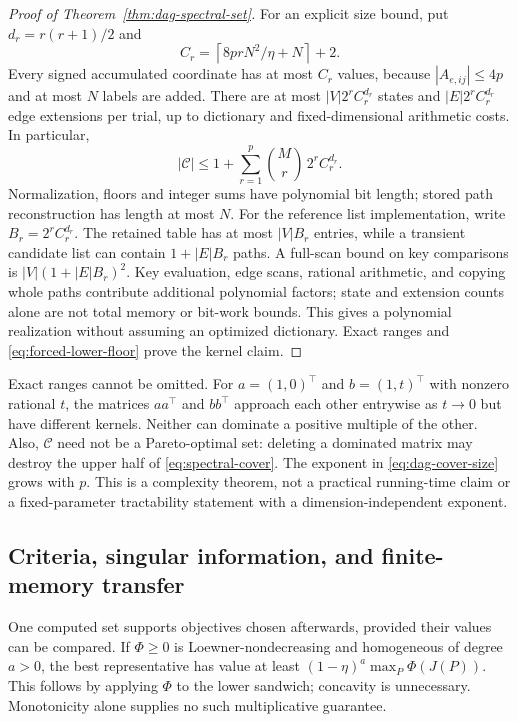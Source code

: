 \begin{proof}[Proof of Theorem~\ref{thm:dag-spectral-set}]
For an explicit size bound, put
$d_r=r(r+1)/2$ and
\[
 C_r=\left\lceil8prN^2/\eta+N\right\rceil+2.
\]
Every signed accumulated coordinate has at most $C_r$ values, because
$|A_{e,ij}|\le4p$ and at most $N$ labels are added. There are at most
$|V|2^rC_r^{d_r}$ states and $|E|2^rC_r^{d_r}$ edge extensions per trial,
up to dictionary and fixed-dimensional arithmetic costs. In particular,
\begin{equation}
 |\mathcal C|\le1+\sum_{r=1}^p\binom Mr\,2^rC_r^{d_r}.
 \label{eq:dag-cover-size}
\end{equation}
Normalization, floors and integer sums have polynomial bit length; stored
path reconstruction has length at most $N$. For the reference list
implementation, write $B_r=2^r C_r^{d_r}$. The retained table has at most
$|V|B_r$ entries, while a transient candidate list can contain
$1+|E|B_r$ paths. A full-scan bound on key comparisons is
$|V|(1+|E|B_r)^2$. Key evaluation, edge scans, rational arithmetic, and
copying whole paths contribute additional polynomial factors; state and
extension counts alone are not total memory or bit-work bounds. This gives
a polynomial realization without assuming an optimized dictionary.
Exact ranges and \eqref{eq:forced-lower-floor} prove the kernel claim.
\end{proof}

Exact ranges cannot be omitted. For $a=(1,0)^\top$ and
$b=(1,t)^\top$ with nonzero rational $t$, the matrices $aa^\top$ and
$bb^\top$ approach each other entrywise as $t\to0$ but have different
kernels. Neither can dominate a positive multiple of the other. Also,
$\mathcal C$ need not be a Pareto-optimal set: deleting a dominated matrix
may destroy the upper half of \eqref{eq:spectral-cover}.
The exponent in \eqref{eq:dag-cover-size} grows with $p$. This is a
complexity theorem, not a practical running-time claim or a fixed-parameter
tractability statement with a dimension-independent exponent.

\subsection{Criteria, singular information, and finite-memory transfer}
\label{subsec:spectral-consequences}
One computed set supports objectives chosen afterwards, provided their
values can be compared. If $\Phi\ge0$ is Loewner-nondecreasing and
homogeneous of degree $a>0$, the best representative has value at least
$(1-\eta)^a\max_P\Phi(J(P))$. This follows by applying $\Phi$ to the lower
sandwich; concavity is unnecessary. Monotonicity alone supplies no such
multiplicative guarantee.

